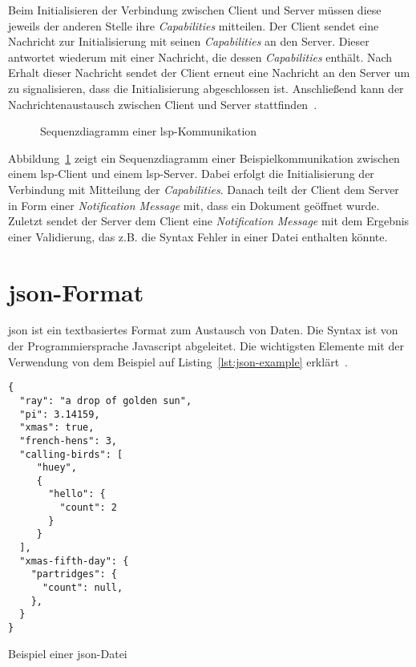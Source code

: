 Beim Initialisieren der Verbindung zwischen Client und Server müssen diese jeweils der anderen Stelle ihre \textit{Capabilities} mitteilen.
Der Client sendet eine Nachricht zur Initialisierung mit seinen \textit{Capabilities} an den Server.
Dieser antwortet wiederum mit einer Nachricht, die dessen \textit{Capabilities} enthält.
Nach Erhalt dieser Nachricht sendet der Client erneut eine Nachricht an den Server um zu signalisieren, dass die Initialisierung abgeschlossen ist.
Anschließend kann der Nachrichtenaustausch zwischen Client und Server stattfinden~\cite{lsp-microsoft,lsp-medium}.

\begin{figure}[htp] %
    \centering
    \caption{Sequenzdiagramm einer \acs{lsp}-Kommunikation}
    \label{fig:lsp-sequence-diagram}
\end{figure}

Abbildung~\ref{fig:lsp-sequence-diagram} zeigt ein Sequenzdiagramm einer Beispielkommunikation zwischen einem \ac{lsp}-Client und einem \ac{lsp}-Server.
Dabei erfolgt die Initialisierung der Verbindung mit Mitteilung der \textit{Capabilities}.
Danach teilt der Client dem Server in Form einer \textit{Notification Message} mit, dass ein Dokument geöffnet wurde.
Zuletzt sendet der Server dem Client eine \textit{Notification Message} mit dem Ergebnis einer Validierung, das z.B. die Syntax Fehler in einer Datei enthalten könnte.


\section{\acs{json}-Format}\label{sec:json-format}

\ac{json} ist ein textbasiertes Format zum Austausch von Daten. Die Syntax ist von der Programmiersprache Javascript abgeleitet.
Die wichtigsten Elemente mit der Verwendung von dem Beispiel auf Listing~\ref{lst:json-example} erklärt~\cite{json-org,json-developer-mozilla}.

\begin{listing}[htp]
    \begin{verbatim}
{
  "ray": "a drop of golden sun",
  "pi": 3.14159,
  "xmas": true,
  "french-hens": 3,
  "calling-birds": [
     "huey",
     {
       "hello": {
         "count": 2
       }
     }    
  ],
  "xmas-fifth-day": {
    "partridges": {
      "count": null,
    },
  }
}
      \end{verbatim}
    \caption{Beispiel einer \acs{json}-Datei}
    \label{lst:json-example}
\end{listing}


